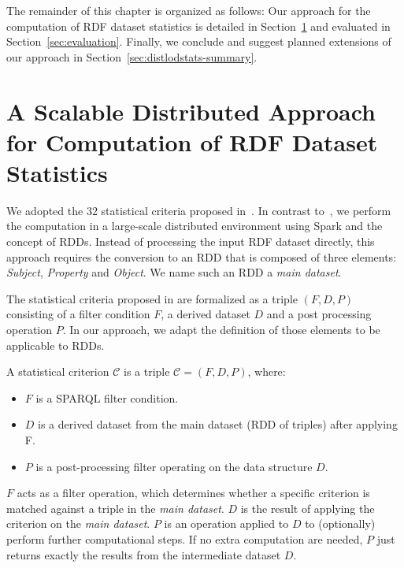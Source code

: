 The remainder of this chapter is organized as follows: 
Our approach for the computation of RDF dataset statistics is detailed in Section~\ref{sec:approach} and evaluated in Section~\ref{sec:evaluation}.
Finally, we conclude and suggest planned extensions of our approach in Section~\ref{sec:distlodstats-summary}.

\section{A Scalable Distributed Approach for Computation of RDF Dataset Statistics}
\label{sec:approach}
We adopted the 32 statistical criteria proposed in~\cite{demter-2012-ekaw}.
In contrast to~\cite{demter-2012-ekaw}, we perform the computation in a large-scale distributed environment using Spark and the concept of \gls{RDD}s.
Instead of processing the input \gls{RDF} dataset directly, this approach requires the conversion to an \gls{RDD} that is composed of three elements: \emph{Subject}, \emph{Property} and \emph{Object}.
We name such an \gls{RDD} a \emph{main dataset}.

The statistical criteria proposed in \cite{demter-2012-ekaw} are formalized as a triple $(F,D,P)$ consisting of a filter condition $F$, a derived dataset $D$ and a post processing operation $P$. 
In our approach, we adapt the definition of those elements to be applicable to \gls{RDD}s.

\begin{definition}
\label{def:statcriteria}
A statistical criterion $\mathcal{C}$ is a triple $\mathcal{C} = (F, D, P)$, where:
  
 \begin{itemize}
 \item $F$ is a SPARQL filter condition. 
 \item $D$ is a derived dataset from the main dataset (\gls{RDD} of triples) after applying F.
 \item $P$ is a post-processing filter operating on the data structure $D$.
\end{itemize}
\end{definition}
\noindent
$F$ acts as a filter operation, which determines whether a specific criterion is matched against a triple in the \emph{main dataset}.
$D$ is the result of applying the criterion on the \emph{main dataset}.
$P$ is an operation applied to $D$ to (optionally) perform further computational steps.
If no extra computation are needed, $P$ just returns exactly the results from the intermediate dataset $D$.

